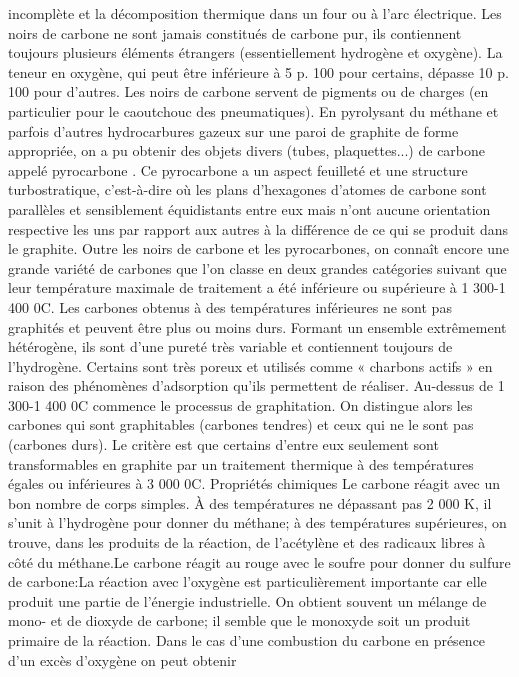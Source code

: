 \documentclass[]{article}
\begin{document}
incomplète et la décomposition thermique dans un four ou à
l'arc électrique. Les noirs de carbone ne sont jamais constitués
de carbone pur, ils contiennent toujours plusieurs éléments
étrangers (essentiellement hydrogène et oxygène). La teneur
en oxygène, qui peut être inférieure à 5 p. 100 pour
certains, dépasse 10 p. 100 pour d'autres. Les noirs de carbone
servent de pigments ou de charges (en particulier pour le caoutchouc
des pneumatiques). En pyrolysant du méthane et parfois d'autres
hydrocarbures gazeux sur une paroi de graphite de forme appropriée,
on a pu obtenir des objets divers (tubes, plaquettes...) de carbone
appelé pyrocarbone . Ce pyrocarbone a un aspect feuilleté et
une structure turbostratique, c'est-à-dire où les plans
d'hexagones d'atomes de carbone sont parallèles et sensiblement
équidistants entre eux mais n'ont aucune orientation respective les
uns par rapport aux autres à la différence de ce qui se produit
dans le graphite.  Outre les noirs de carbone et les pyrocarbones, on
connaît encore une grande variété de carbones que l'on classe
en deux grandes catégories suivant que leur température maximale
de traitement a été inférieure ou supérieure à
1 300-1 400 0C. Les carbones obtenus à des températures
inférieures ne sont pas graphités et peuvent être plus ou
moins durs. Formant un ensemble extrêmement hétérogène,
ils sont d'une pureté très variable et contiennent toujours de
l'hydrogène. Certains sont très poreux et utilisés comme
« charbons actifs » en raison des phénomènes
d'adsorption qu'ils permettent de réaliser. Au-dessus de
1 300-1 400 0C commence le processus de graphitation. On
distingue alors les carbones qui sont graphitables (carbones tendres)
et ceux qui ne le sont pas (carbones durs). Le critère est que
certains d'entre eux seulement sont transformables en graphite par un
traitement thermique à des températures égales ou
inférieures à 3 000 0C.  Propriétés chimiques Le
carbone réagit avec un bon nombre de corps simples. À des
températures ne dépassant pas 2 000 K, il s'unit à
l'hydrogène pour donner du méthane; à des températures
supérieures, on trouve, dans les produits de la réaction, de
l'acétylène et des radicaux libres  à
côté du méthane.Le carbone réagit au rouge avec le soufre
pour donner du sulfure de carbone:La réaction avec l'oxygène est
particulièrement importante car elle produit une partie de
l'énergie industrielle. On obtient souvent un mélange de
mono- et de dioxyde de carbone; il semble que le monoxyde soit un
produit primaire de la réaction. Dans le cas d'une combustion du
carbone en présence d'un excès d'oxygène on peut obtenir
\end{document}

